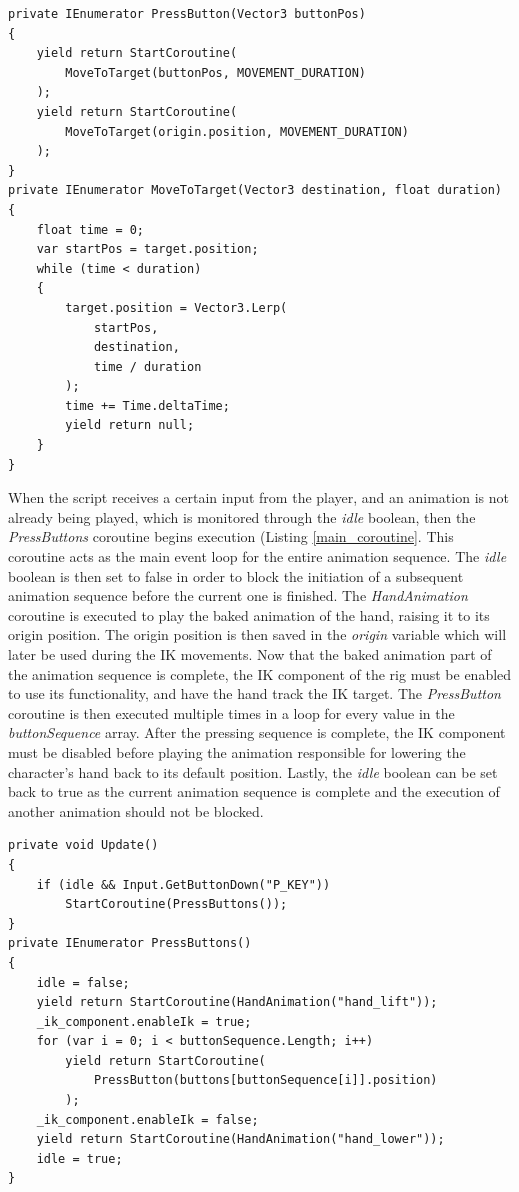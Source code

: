 \begin{lstlisting}[basicstyle=\footnotesize, numbers=none,frame=single,
caption={The coroutine \textit{PressButton} executes two \textit{MoveToTarget}
coroutines, moving the end effector's target to the specified button, and then
back to the origin position. \textit{IKPressButton.cs}},captionpos=b,
label=second_coroutine, language={[Sharp]c}, float=tp]
private IEnumerator PressButton(Vector3 buttonPos)
{
    yield return StartCoroutine(
        MoveToTarget(buttonPos, MOVEMENT_DURATION)
    );
    yield return StartCoroutine(
        MoveToTarget(origin.position, MOVEMENT_DURATION)
    );
}
private IEnumerator MoveToTarget(Vector3 destination, float duration)
{
    float time = 0;
    var startPos = target.position;
    while (time < duration)
    {
        target.position = Vector3.Lerp(
            startPos,
            destination,
            time / duration
        );
        time += Time.deltaTime;
        yield return null;
    }
}
\end{lstlisting}

When the script receives a certain input from the player, and an animation is
not already being played, which is monitored through the \textit{idle} boolean,
then the \textit{PressButtons} coroutine begins execution (Listing
\ref{main_coroutine}. This coroutine acts as the main event loop for the entire
animation sequence. The \textit{idle} boolean is then set to false in order to
block the initiation of a subsequent animation sequence before the current one
is finished. The \textit{HandAnimation} coroutine is executed to play the baked
animation of the hand, raising it to its origin position. The origin position is
then saved in the \textit{origin} variable which will later be used during the
IK movements. Now that the baked animation part of the animation sequence is
complete, the IK component of the rig must be enabled to use its functionality,
and have the hand track the IK target. The \textit{PressButton} coroutine is
then executed multiple times in a loop for every value in the
\textit{buttonSequence} array. After the pressing sequence is complete, the IK
component must be disabled before playing the animation responsible for lowering
the character's hand back to its default position. Lastly, the \textit{idle}
boolean can be set back to true as the current animation sequence is complete
and the execution of another animation should not be blocked.
\begin{lstlisting}[basicstyle=\footnotesize, numbers=none,frame=single,
caption={Reading input, and executing the main coroutine \textit{PressButtons}
which plays the full animation sequence. \textit{IKPressButton.cs}},captionpos=b,
label=main_coroutine, language={[Sharp]c}, float=tp]
private void Update()
{
    if (idle && Input.GetButtonDown("P_KEY"))
        StartCoroutine(PressButtons());
}
private IEnumerator PressButtons()
{
    idle = false;
    yield return StartCoroutine(HandAnimation("hand_lift"));
    _ik_component.enableIk = true;
    for (var i = 0; i < buttonSequence.Length; i++)
        yield return StartCoroutine(
            PressButton(buttons[buttonSequence[i]].position)
        );
    _ik_component.enableIk = false;
    yield return StartCoroutine(HandAnimation("hand_lower"));
    idle = true;
}
\end{lstlisting}
